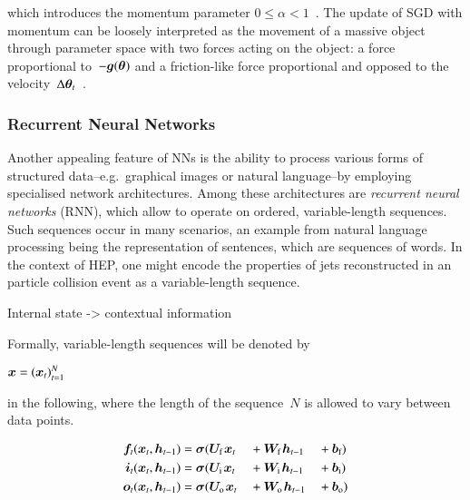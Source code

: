 which introduces the momentum parameter
$0 \leq \alpha < 1$~\cite{rumelhart1986learning,Goodfellow-et-al-2016}. The
update of SGD with momentum can be loosely interpreted as the movement of a
massive object through parameter space with two forces acting on the object: a
force proportional to~$-\bm{g}(\bm{\theta})$ and a friction-like force
proportional and opposed to the
velocity~$\Delta\bm{\theta}_{t}$~\cite{Goodfellow-et-al-2016}.


\subsubsection{Recurrent Neural Networks}%
\label{sec:rnn}

Another appealing feature of NNs is the ability to process various forms of
structured data--e.g.~graphical images or natural language--by employing
specialised network architectures. Among these architectures are \emph{recurrent
  neural networks} (RNN), which allow to operate on ordered, variable-length
sequences. Such sequences occur in many scenarios, an example from natural
language processing being the representation of sentences, which are sequences
of words. In the context of HEP, one might encode the properties of jets
reconstructed in an particle collision event as a variable-length sequence.

Internal state -> contextual information

Formally, variable-length sequences will be denoted by

$\bm{x} = (\bm{x}_{t})_{t = 1}^{N}$

in the following, where the length of the sequence~$N$ is allowed to vary
between data points.


\begin{alignat*}{3}
  \bm{f}_{t}(\bm{x}_{t}, \bm{h}_{t-1}) &= \bm{\sigma}(\bm{U}_{\text{f}} \kern1pt \bm{x}_{t} &&+ \bm{W}_{\text{f}} \kern1pt \bm{h}_{t - 1} &&+ \bm{b}_{\text{f}}) \\
  \bm{i}_{t}(\bm{x}_{t}, \bm{h}_{t-1}) &= \bm{\sigma}(\bm{U}_{\text{i}} \kern1pt \bm{x}_{t} &&+ \bm{W}_{\text{i}} \kern1pt \bm{h}_{t - 1} &&+ \bm{b}_{\text{i}}) \\
  \bm{o}_{t}(\bm{x}_{t}, \bm{h}_{t-1}) &= \bm{\sigma}(\bm{U}_{\text{o}} \kern1pt \bm{x}_{t} &&+ \bm{W}_{\text{o}} \kern1pt \bm{h}_{t - 1} &&+ \bm{b}_{\text{o}})
\end{alignat*}


